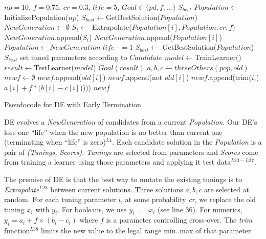 \begin{algorithm}[!t]

\scriptsize
\begin{algorithmic}[1]
\Require $\mathit{np} = 10$, $f=0.75$, $cr=0.3$, $\mathit{life} = 5$, $\mathit{Goal} \in \{\mathit{pd},f,...\}$
\Ensure $S_{best}$
\vspace{2mm}
 \State $Population  \gets $ InitializePopulation($\mathit{np}$)   
 \State $S_{best} \gets $GetBestSolution($Population $)
\State $NewGeneration \gets \emptyset$
\State $S_i \gets$ Extrapolate($Population [i], Population , cr, f$)
\State $NewGeneration$.append($S_i$)
\Else
\State $NewGeneration$.append($Population [i]$)
\EndIf
\EndFor
\State $Population  \gets NewGeneration$
\State $life -=1$
\EndIf
\State $S_{best} \gets$ GetBestSolution($Population $)
 \EndWhile
\State \Return $S_{best}$
\EndFunction
{}
   \State set tuned parameters according to $Candidate$
   \State $model \gets$TrainLearner()
   \State $result \gets$TestLearner($model$)   
   \State \Return$\mathit{Goal}(result)$  
\EndFunction
{}
  \State $a, b, c\gets threeOthers(pop,old)$  
  \State $newf \gets \emptyset$
         \State $newf$.append($old[i]$)
                \Else
                    \State $newf$.append(not $old[i]$)
         \Else
          \State $newf$.append(trim($i$,($a[i] + f * (b[i] - c[i]$)))) 
         \EndIf
       \EndIf
  \EndFor
 \State \Return $newf$
\EndFunction
        \end{algorithmic} 
\caption{Pseudocode for DE with Early Termination}
\label{alg:DE}
\end{algorithm}



DE evolves a {\em NewGeneration} of candidates  from
a current {\em Population}.  Our DE's lose one ``life''
when the new population is no better than  current one (terminating when ``life'' is zero)$^{L4}$.
Each candidate solution in the {\em Population}  
is a pair of {\em (Tunings, Scores)}.  {\em Tunings} are selected from
{parameters} and {\em Scores} come from training a learner using those parameters
and applying it     test data$^{L23-L27}$.

The premise of DE  is that the best way to mutate the existing tunings
is to {\em Extrapolate}$^{L28}$
between current solutions.  Three solutions $a,b,c$ are selected at random.
For each tuning parameter $i$, at some probability {\em cr}, we replace
the old tuning $x_i$ with $y_i$. For booleans, we use $y_i= \neg x_i$ (see line 36). For numerics, $y_i = a_i+f \times (b_i - c_i)$   where $f$ is a parameter
controlling  cross-over.  The {\em trim} function$^{L38}$ limits the new
value to the legal range min..max of that parameter.
 
